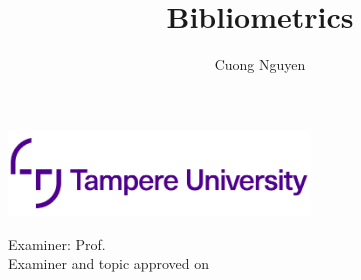 \documentclass[12pt,a4paper,english
]{tutthesis}
\author{Cuong Nguyen}
\title{Bibliometrics} %
\begin{document}
\makeatletter



%
\thispagestyle{empty}
\vspace*{-.5cm}\noindent
\includegraphics[width=8cm]{Tampere_University_logo.png}   %



\vspace{6.8cm}
\maketitle
\vspace{7.7cm} %

\begin{flushright}  
  \begin{minipage}[c]{7.8cm}
    \begin{spacing}{1.0}
      \textsf{Examiner: Prof. \@examiner}\\
      \textsf{Examiner and topic approved on}
    \end{spacing}
  \end{minipage}
\end{flushright}

\if@twoside
\clearpage
\fi
\end{document}
